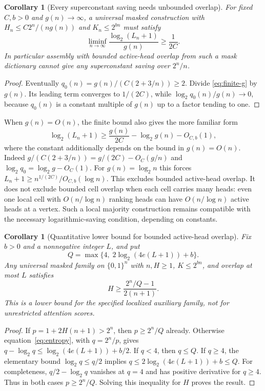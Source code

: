 \documentclass[11pt]{article}
\newtheorem{corollary}[theorem]{Corollary}
\newcommand{\Qn}{\{0,1\}^n}
\begin{document}
\begin{corollary}[Every superconstant saving needs unbounded overlap]
For fixed $C,b>0$ and $g(n)\to\infty$, a universal masked
construction with $H_n\leq C2^n/(ng(n))$ and $K_n\leq2^{bn}$ must
satisfy
\[
 \liminf_{n\to\infty}
 \frac{\log_2(L_n+1)}{g(n)}\geq\frac1{2C}.
\]
In particular assembly with bounded active-head overlap from such a mask dictionary
cannot give \emph{any} superconstant saving over $2^n/n$.
\end{corollary}
\begin{proof}
Eventually $q_0(n)=g(n)/(C(2+3/n))\geq2$.
Divide \eqref{eq:finite-g} by $g(n)$. Its leading term converges to
$1/(2C)$, while $\log_2q_0(n)/g(n)\to0$, because $q_0(n)$ is a
constant multiple of $g(n)$ up to a factor tending to one.
\end{proof}

When $g(n)=O(n)$, the finite bound also gives the more familiar form
\[
 \log_2(L_n+1)\geq \frac{g(n)}{2C}-\log_2g(n)-O_{C,b}(1),
\]
where the constant additionally depends on the bound in $g(n)=O(n)$.
Indeed $g/(C(2+3/n))=g/(2C)-O_C(g/n)$ and
$\log_2q_0=\log_2g-O_C(1)$.
For $g(n)=\log_2 n$ this forces
$L_n+1\geq n^{1/(2C)}/O_{C,b}(\log n)$.
This excludes bounded active-head overlap. It does not exclude bounded
cell overlap when each cell carries many heads: even one local cell
with $O(n/\log n)$ ranking heads can have $O(n/\log n)$ active heads
at a vertex. Such a local majority construction remains compatible with
the necessary logarithmic-saving condition, depending on constants.

\begin{corollary}[Quantitative lower bound for bounded active-head overlap]
Fix $b>0$ and a nonnegative integer $L$, and put
\[
 Q=\max\{4,\;2\log_2(4e(L+1))+b\}.
\]
Any universal masked family on $\Qn$ with $n,H\geq1$,
$K\leq2^{bn}$, and overlap at most $L$ satisfies
\[
 H\geq\frac{2^n/Q-1}{2(n+1)}.
\]
This is a lower bound for the specified localized auxiliary family,
not for unrestricted attention scores.
\end{corollary}
\begin{proof}
If $p=1+2H(n+1)>2^n$, then $p\geq2^n/Q$ already.
Otherwise equation~\eqref{eq:entropy}, with $q=2^n/p$, gives
$q-\log_2q\leq\log_2(4e(L+1))+b/2$.
If $q<4$, then $q\leq Q$. If $q\geq4$, the elementary bound
$\log_2q\leq q/2$ implies
$q\leq2\log_2(4e(L+1))+b\leq Q$.
For completeness, $q/2-\log_2q$ vanishes at $q=4$ and has positive
derivative for $q\geq4$. Thus in both cases $p\geq2^n/Q$.
Solving this inequality for $H$ proves the result.
\end{proof}
\end{document}
